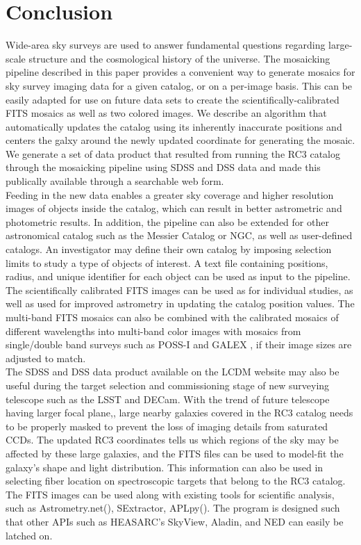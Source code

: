\documentclass[5p]{elsarticle}
\begin{document}
 \section{Conclusion}
\indent Wide-area sky surveys are used to answer fundamental questions regarding large-scale structure and the cosmological history of the universe. The mosaicking pipeline described in this paper provides a convenient way to generate mosaics for sky survey imaging data for a given catalog, or on a per-image basis. This can be easily adapted for use on future data sets to create the scientifically-calibrated FITS mosaics as well as two colored images. We describe an algorithm that automatically updates the catalog using its inherently inaccurate positions and centers the galxy around the newly updated coordinate for generating the mosaic. We generate a set of data product that resulted from running the RC3 catalog through the mosaicking pipeline using  SDSS and DSS data and  made this publically available through a searchable web form.
\\
\indent Feeding in the new data enables a greater  sky coverage and higher resolution images of objects inside the catalog, which can result in better astrometric and photometric results.  In addition, the pipeline can also be extended for other astronomical catalog such as the Messier Catalog or NGC, as well as user-defined catalogs. An investigator may define their own catalog by imposing selection limits to study a type of objects of interest. A text file containing positions, radius, and unique identifier for each object can be used as input to the pipeline. The scientifically calibrated FITS images can be used as for individual studies, as well as used for improved astrometry in updating the catalog position values. The multi-band FITS mosaics can also be combined with the calibrated mosaics of different wavelengths into multi-band color images with mosaics from single/double band surveys such as POSS-I and GALEX , if their image sizes are adjusted to match.  %
\\
\indent The SDSS and DSS data product available on the LCDM website may also be useful  during  the target selection and commissioning stage of new surveying telescope such as the LSST and DECam. With the trend of future telescope having larger focal plane,, large nearby galaxies covered in the RC3 catalog needs to be properly masked to prevent the loss of imaging details from saturated CCDs. The updated RC3 coordinates tells us  which regions of the sky may be affected by these large galaxies, and the FITS files can be used to model-fit the galaxy's shape and light distribution. This information can also be used in selecting fiber location on spectroscopic targets that belong to the RC3 catalog. The FITS images can be used along with existing tools for scientific analysis, such as Astrometry.net(\citet{astrometry.net}), SExtractor, APLpy(\citet{aplpy}). The program is designed such that other APIs such as HEASARC's SkyView, Aladin, and NED can easily be latched on.
\end{document}

